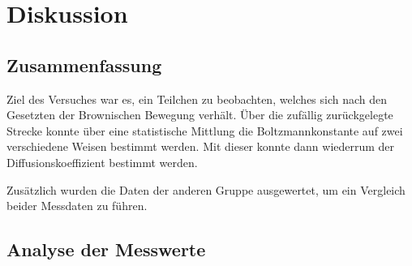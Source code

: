\chapter{Diskussion}
\label{ch:Diskussion}

\section{Zusammenfassung}
\label{sec:Zusammenfassung}
Ziel des Versuches war es, ein Teilchen zu beobachten, welches sich nach den Gesetzten der Brownischen Bewegung verhält. Über die zufällig zurückgelegte Strecke konnte über eine statistische Mittlung die Boltzmannkonstante auf zwei verschiedene Weisen bestimmt werden. 
Mit dieser konnte dann wiederrum der Diffusionskoeffizient bestimmt werden. 

Zusätzlich wurden die Daten der anderen Gruppe ausgewertet, um ein Vergleich beider Messdaten zu führen.

\section{Analyse der Messwerte}
\label{sec:Analyse}
